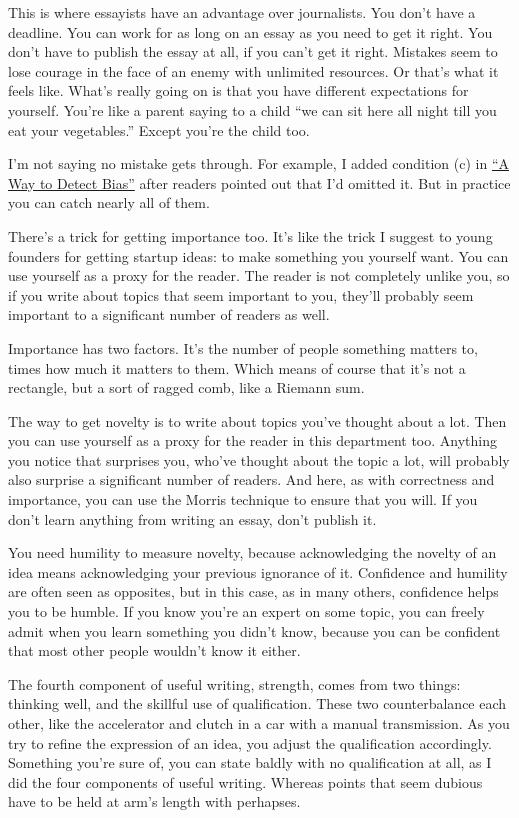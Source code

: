 \documentclass[12pt]{book}
\begin{document}
This is where essayists have an advantage over journalists. You don't
have a deadline. You can work for as long on an essay as you need to get
it right. You don't have to publish the essay at all, if you can't get
it right. Mistakes seem to lose courage in the face of an enemy with
unlimited resources. Or that's what it feels like. What's really going
on is that you have different expectations for yourself. You're like a
parent saying to a child ``we can sit here all night till you eat your
vegetables.'' Except you're the child too.

I'm not saying no mistake gets through. For example, I added condition
(c) in \href{bias.html}{``A Way to Detect Bias''} after readers pointed
out that I'd omitted it. But in practice you can catch nearly all of
them.

There's a trick for getting importance too. It's like the trick I
suggest to young founders for getting startup ideas: to make something
you yourself want. You can use yourself as a proxy for the reader. The
reader is not completely unlike you, so if you write about topics that
seem important to you, they'll probably seem important to a significant
number of readers as well.

Importance has two factors. It's the number of people something matters
to, times how much it matters to them. Which means of course that it's
not a rectangle, but a sort of ragged comb, like a Riemann sum.

The way to get novelty is to write about topics you've thought about a
lot. Then you can use yourself as a proxy for the reader in this
department too. Anything you notice that surprises you, who've thought
about the topic a lot, will probably also surprise a significant number
of readers. And here, as with correctness and importance, you can use
the Morris technique to ensure that you will. If you don't learn
anything from writing an essay, don't publish it.

You need humility to measure novelty, because acknowledging the novelty
of an idea means acknowledging your previous ignorance of it. Confidence
and humility are often seen as opposites, but in this case, as in many
others, confidence helps you to be humble. If you know you're an expert
on some topic, you can freely admit when you learn something you didn't
know, because you can be confident that most other people wouldn't know
it either.

The fourth component of useful writing, strength, comes from two things:
thinking well, and the skillful use of qualification. These two
counterbalance each other, like the accelerator and clutch in a car with
a manual transmission. As you try to refine the expression of an idea,
you adjust the qualification accordingly. Something you're sure of, you
can state baldly with no qualification at all, as I did the four
components of useful writing. Whereas points that seem dubious have to
be held at arm's length with perhapses.
\end{document}
